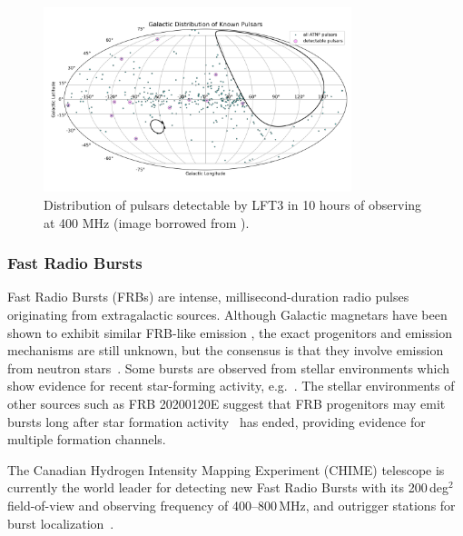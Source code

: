 \begin{figure}[h]
    \centering
    \includegraphics[width=0.8\textwidth]{figures/PulsarDectability.png}
    \caption{Distribution of pulsars detectable by LFT3 in 10 hours of observing at 400 MHz (image borrowed from \citealt{prabu2025lft3}).}
    \label{fig:pulsarDectability}
\end{figure}


\subsubsection{Fast Radio Bursts}
Fast Radio Bursts (FRBs) are intense,
millisecond-duration radio pulses originating from extragalactic sources. 
Although Galactic magnetars have been shown to exhibit similar FRB-like emission \citep{BC_2020,chime2020sgr1935}, the exact progenitors and emission mechanisms are still unknown, but the consensus is that they involve emission from neutron stars~\citep{ck21}. Some bursts are observed from stellar environments which show evidence for recent star-forming activity, e.g.~\citet{piro2021}. The stellar environments of other sources such as FRB 20200120E suggest that FRB progenitors may emit bursts long after star formation activity~\citep{kirsten2022m81} has ended, providing evidence for multiple formation channels.

The Canadian Hydrogen Intensity Mapping Experiment (CHIME) telescope is currently the world leader for detecting new Fast Radio Bursts with its 200\,deg$^{2}$ field-of-view and observing frequency of 400--800\,MHz, and outrigger stations for burst localization~\citep{leung2021synoptic,lanman2024kko}. 

